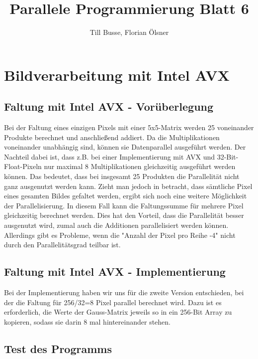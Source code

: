 \documentclass[12pt,a4paper]{article}
\author{Till Busse, Florian Ölsner}
\title{Parallele Programmierung Blatt 6}
\begin{document}
\maketitle
\pagebreak
\section{Bildverarbeitung mit Intel AVX}
\subsection{Faltung mit Intel AVX - Vorüberlegung}
Bei der Faltung eines einzigen Pixels mit einer 5x5-Matrix werden 25 voneinander Produkte berechnet und anschließend addiert. Da die Multiplikationen voneinander unabhängig sind, können sie Datenparallel ausgeführt werden. Der Nachteil dabei ist, dass z.B. bei einer Implementierung mit AVX und 32-Bit-Float-Pixeln nur maximal 8 Multiplikationen gleichzeitig ausgeführt werden können. Das bedeutet, dass bei insgesamt 25 Produkten die Parallelität nicht ganz ausgenutzt werden kann. Zieht man jedoch in betracht, dass sämtliche Pixel eines gesamten Bildes gefaltet werden, ergibt sich noch eine weitere Möglichkeit der Parallelisierung. In diesem Fall kann die Faltungssumme für mehrere Pixel gleichzeitig berechnet werden. Dies hat den Vorteil, dass die Parallelität besser ausgenutzt wird, zumal auch die Additionen parallelisiert werden können. Allerdings gibt es Probleme, wenn die "Anzahl der Pixel pro Reihe -4" nicht durch den Parallelitätsgrad teilbar ist.
\subsection{Faltung mit Intel AVX - Implementierung}
Bei der Implementierung haben wir uns für die zweite Version entschieden, bei der die Faltung für 256/32=8 Pixel parallel berechnet wird. Dazu ist es erforderlich, die Werte der Gauss-Matrix jeweils so in ein 256-Bit Array zu kopieren, sodass sie darin 8 mal hintereinander stehen.

\subsection{Test des Programms}
\end{document}
